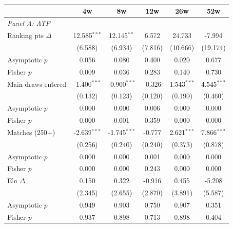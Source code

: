\begin{tabular}{l ccccc}
\toprule
 & 4w & 8w & 12w & 26w & 52w \\
\midrule
\multicolumn{6}{l}{\textit{Panel A: ATP}} \\
\midrule
Ranking pts $\Delta$ & 12.585$^{***}$ & 12.145$^{**}$ & 6.572 & 24.733 & -7.994 \\
  & (6.588) & (6.934) & (7.816) & (10.666) & (19.174) \\
  Asymptotic $p$ & 0.056 & 0.080 & 0.400 & 0.020 & 0.677 \\
  Fisher $p$ & 0.009 & 0.036 & 0.283 & 0.140 & 0.730 \\[0.3em]
Main draws entered & -1.400$^{***}$ & -0.900$^{***}$ & -0.326 & 1.543$^{***}$ & 4.545$^{***}$ \\
  & (0.132) & (0.123) & (0.120) & (0.190) & (0.460) \\
  Asymptotic $p$ & 0.000 & 0.000 & 0.006 & 0.000 & 0.000 \\
  Fisher $p$ & 0.000 & 0.001 & 0.359 & 0.000 & 0.000 \\[0.3em]
Matches (250+) & -2.639$^{***}$ & -1.745$^{***}$ & -0.777 & 2.621$^{***}$ & 7.866$^{***}$ \\
  & (0.256) & (0.240) & (0.240) & (0.373) & (0.878) \\
  Asymptotic $p$ & 0.000 & 0.000 & 0.001 & 0.000 & 0.000 \\
  Fisher $p$ & 0.000 & 0.000 & 0.243 & 0.000 & 0.000 \\[0.3em]
Elo $\Delta$ & 0.150 & 0.322 & -0.916 & 0.455 & -5.208 \\
  & (2.345) & (2.655) & (2.870) & (3.891) & (5.587) \\
  Asymptotic $p$ & 0.949 & 0.903 & 0.750 & 0.907 & 0.351 \\
  Fisher $p$ & 0.937 & 0.898 & 0.713 & 0.898 & 0.404 \\[0.3em]


\end{tabular}
